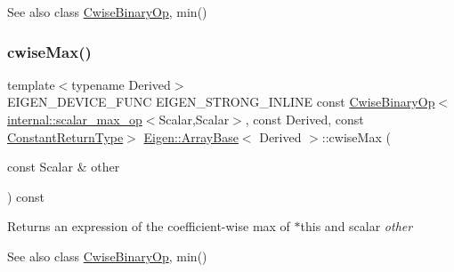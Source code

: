 \begin{DoxySeeAlso}{See also}
class \mbox{\hyperlink{class_eigen_1_1_cwise_binary_op}{Cwise\+Binary\+Op}}, min() 
\end{DoxySeeAlso}
\mbox{\label{class_eigen_1_1_array_base_af4a304df66f2c3059224d26155918084}} 
\subsubsection{\texorpdfstring{cwiseMax()}{cwiseMax()}\hspace{0.1cm}{\footnotesize\ttfamily [2/2]}}
{\footnotesize\ttfamily template$<$typename Derived$>$ \\
E\+I\+G\+E\+N\+\_\+\+D\+E\+V\+I\+C\+E\+\_\+\+F\+U\+NC E\+I\+G\+E\+N\+\_\+\+S\+T\+R\+O\+N\+G\+\_\+\+I\+N\+L\+I\+NE const \mbox{\hyperlink{class_eigen_1_1_cwise_binary_op}{Cwise\+Binary\+Op}}$<$\mbox{\hyperlink{struct_eigen_1_1internal_1_1scalar__max__op}{internal\+::scalar\+\_\+max\+\_\+op}}$<$Scalar,Scalar$>$, const Derived, const \mbox{\hyperlink{class_eigen_1_1_cwise_nullary_op}{Constant\+Return\+Type}}$>$ \mbox{\hyperlink{class_eigen_1_1_array_base}{Eigen\+::\+Array\+Base}}$<$ Derived $>$\+::cwise\+Max (\begin{DoxyParamCaption}\item[{const Scalar \&}]{other }\end{DoxyParamCaption}) const\hspace{0.3cm}{\ttfamily [inline]}}

\begin{DoxyReturn}{Returns}
an expression of the coefficient-\/wise max of $\ast$this and scalar {\itshape other} 
\end{DoxyReturn}
\begin{DoxySeeAlso}{See also}
class \mbox{\hyperlink{class_eigen_1_1_cwise_binary_op}{Cwise\+Binary\+Op}}, min() 
\end{DoxySeeAlso}
\mbox{\label{class_eigen_1_1_array_base_a6240050ea0f5fc52d5ed3d6252e4bbcd}} 

